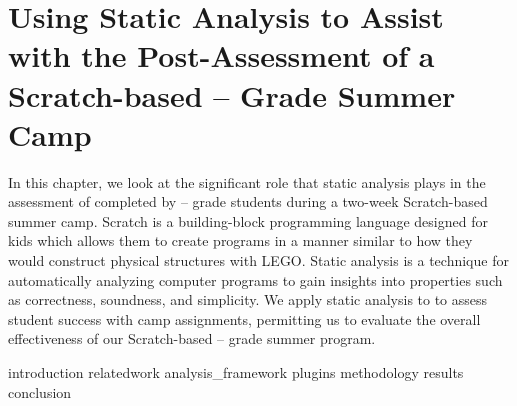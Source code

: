 \chapter{Using Static Analysis to Assist with the Post-Assessment of a
  Scratch-based -- Grade Summer Camp}
\label{chap:hairball}

In this chapter, we look at the significant role that static analysis plays in
the assessment of  completed by -- grade students
during a two-week Scratch-based summer camp. Scratch is a building-block
programming language designed for kids which allows them to create programs in
a manner similar to how they would construct physical structures with
LEGO\textregistered{}. Static analysis is a technique for automatically
analyzing computer programs to gain insights into properties such as
correctness, soundness, and simplicity. We apply static analysis to
 to assess student success with camp assignments, permitting us to
evaluate the overall effectiveness of our Scratch-based -- grade
summer program.

\iffull
\def\currentprefix{hairball}
{introduction}
{relatedwork}
{analysis_framework}
{plugins}
{methodology}
{results}
{conclusion}
\fi
